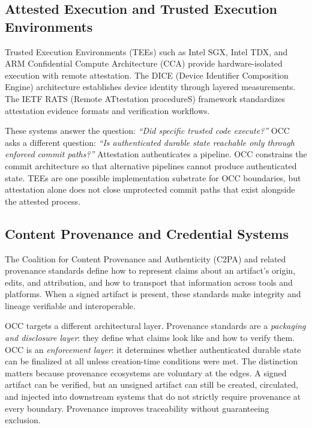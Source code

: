 \documentclass[11pt,letterpaper]{article}
\theoremstyle{occplain}
\theoremstyle{occremark}
\begin{document}
\subsection{Attested Execution and Trusted Execution Environments}
\label{sec:tees}

Trusted Execution Environments (TEEs) such as Intel SGX, Intel TDX, and ARM Confidential Compute Architecture (CCA) provide hardware-isolated execution with remote attestation. The DICE (Device Identifier Composition Engine) architecture establishes device identity through layered measurements. The IETF RATS (Remote ATtestation procedureS) framework standardizes attestation evidence formats and verification workflows.

These systems answer the question: \emph{``Did specific trusted code execute?''} OCC asks a different question: \emph{``Is authenticated durable state reachable only through enforced commit paths?''} Attestation authenticates a pipeline. OCC constrains the commit architecture so that alternative pipelines cannot produce authenticated state. TEEs are one possible implementation substrate for OCC boundaries, but attestation alone does not close unprotected commit paths that exist alongside the attested process.


\subsection{Content Provenance and Credential Systems}
\label{sec:provenance-systems}

The Coalition for Content Provenance and Authenticity (C2PA) and related provenance standards define how to represent claims about an artifact's origin, edits, and attribution, and how to transport that information across tools and platforms. When a signed artifact is present, these standards make integrity and lineage verifiable and interoperable.

OCC targets a different architectural layer. Provenance standards are a \emph{packaging and disclosure layer}: they define what claims look like and how to verify them. OCC is an \emph{enforcement layer}: it determines whether authenticated durable state can be finalized at all unless creation-time conditions were met. The distinction matters because provenance ecosystems are voluntary at the edges. A signed artifact can be verified, but an unsigned artifact can still be created, circulated, and injected into downstream systems that do not strictly require provenance at every boundary. Provenance improves traceability without guaranteeing exclusion.
\end{document}
